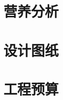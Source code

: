 \documentclass{spacelifepaper}
\begin{document}
\maketitle
\tableofcontents
\listoffigures
\listoftables









\appendix
\chapter{营养分析}
\label{apx:nutrition}


\chapter{设计图纸}
\label{apx:blueprint}


\chapter{工程预算}
\label{apx:budget}




\end{document}

